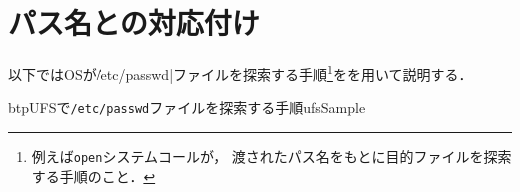 \section{パス名と\inode の対応付け}

以下ではOSが\|/etc/passwd|ファイルを探索する手順\footnote{
  例えば\texttt{open}システムコールが，
  渡されたパス名をもとに目的ファイルを探索する手順のこと．
}をを用いて説明する．

\begin{myfig}{btp}{UFSで\texttt{/etc/passwd}ファイルを探索する手順}{ufsSample}
\end{myfig}

